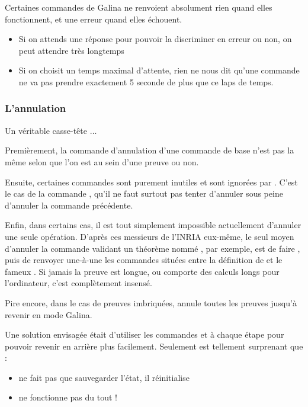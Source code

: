         	Certaines commandes de Galina ne renvoient absolument rien quand elles fonctionnent, et une erreur quand elles échouent.
        	\begin{itemize}
        		\item Si on attends une réponse pour pouvoir la discriminer en erreur ou non, on peut attendre très longtemps
        		\item Si on choisit un temps maximal d'attente, rien ne nous dit qu'une commande ne va pas prendre exactement 5 seconde de plus que ce laps de temps.
        	\end{itemize}

    	\subsubsection{L'annulation}

    	    Un véritable casse-tête $\ldots$
    	    
    	    Premièrement, la commande d'annulation d'une commande de base n'est pas la même selon que l'on est au sein d'une preuve ou non.
    	    
    	    Ensuite, certaines commandes sont purement inutiles et sont ignorées par \coqtop{}.
    	    C'est le cas de la commande , qu'il ne faut surtout pas tenter d'annuler sous peine d'annuler la commande précédente.
    	    
    	    Enfin, dans certains cas, il est tout simplement impossible actuellement d'annuler une seule opération.
    	    D'après ces messieurs de l'INRIA eux-même, le seul moyen d'annuler la commande  validant un théorème nommé , par exemple, est de faire , puis de renvoyer une-à-une les commandes situées entre la définition de  et le fameux .
    	    Si jamais la preuve est longue, ou comporte des calculs longs pour l'ordinateur, c'est complètement insensé.
    	    
    	    Pire encore, dans le cas de preuves imbriquées,  annule toutes les preuves jusqu'à revenir en mode Galina.
    	    
            Une solution envisagée était d'utiliser les commandes  et  à chaque étape pour pouvoir revenir en arrière plus facilement.
            Seulement \coqtop{} est tellement surprenant que :
            \begin{itemize}
             	\item {} ne fait pas que sauvegarder l'état, il réinitialise \coqtop{}
             	\item {} ne fonctionne pas du tout !
             \end{itemize}
		
